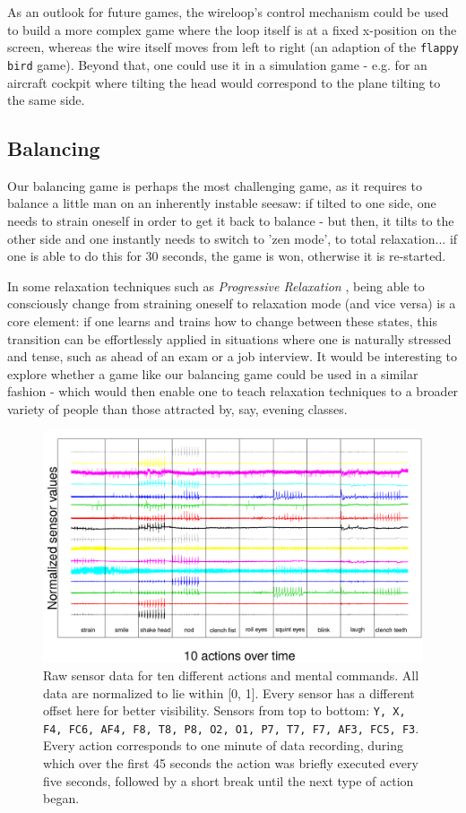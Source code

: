 \documentclass{utue} %
\begin{document}
As an outlook for future games, the wireloop's control mechanism could be used to build a more complex game where the loop itself is at a fixed x-position on the screen, whereas the wire itself moves from left to right (an adaption of the \texttt{flappy bird} game). Beyond that, one could use it in a simulation game - e.g. for an aircraft cockpit where tilting the head would correspond to the plane tilting to the same side.

\subsection{Balancing}
Our balancing game is perhaps the most challenging game, as it requires to balance a little man on an inherently instable seesaw: if tilted to one side, one needs to strain oneself in order to get it back to balance - but then, it tilts to the other side and one instantly needs to switch to 'zen mode', to total relaxation... if one is able to do this for 30 seconds, the game is won, otherwise it is re-started.

In some relaxation techniques such as \textit{Progressive Relaxation} \cite{Jacobson1938}, being able to consciously change from straining oneself to relaxation mode (and vice versa) is a core element: if one learns and trains how to change between these states, this transition can be effortlessly applied in situations where one is naturally stressed and tense, such as ahead of an exam or a job interview. It would be interesting to explore whether a game like our balancing game could be used in a similar fashion - which would then enable one to teach relaxation techniques to a broader variety of people than those attracted by, say, evening classes.

\begin{figure}[h!]
	\centering
	\includegraphics[width=1.0\textwidth]{images/sensor_values.png}
	\caption{Raw sensor data for ten different actions and mental commands. All data are normalized to lie within [0, 1]. Every sensor has a different offset here for better visibility. Sensors from top to bottom: \texttt{Y, X, F4, FC6, AF4, F8, T8, P8, O2, O1, P7, T7, F7, AF3, FC5, F3}. Every action corresponds to one minute of data recording, during which over the first 45 seconds the action was briefly executed every five seconds, followed by a short break until the next type of action began.}
	\label{fig:sensor_values}
\end{figure}
\end{document}
